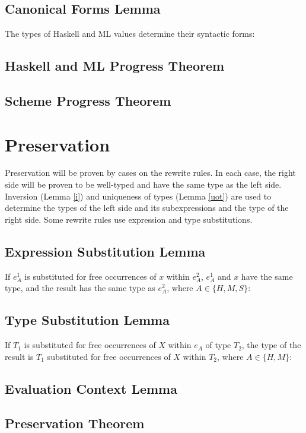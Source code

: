 \subsection{Canonical Forms Lemma}

The types of Haskell and ML values determine their syntactic forms:



\subsection{Haskell and ML Progress Theorem}



\subsection{Scheme Progress Theorem}



\section{Preservation}

Preservation will be proven by cases on the rewrite rules.  In each case, the right side will be proven to be well-typed and have the same type as the left side.  Inversion (Lemma \ref{i}) and uniqueness of types (Lemma \ref{uot}) are used to determine the types of the left side and its subexpressions and the type of the right side.  Some rewrite rules use expression and type substitutions.

\subsection{Expression Substitution Lemma}

If $e_{A}^{1}$ is substituted for free occurrences of $x$ within $e_{A}^{2}$, $e_{A}^{1}$ and $x$ have the same type, and the result has the same type as $e_{A}^{2}$, where $A\in\lbrace H,M,S\rbrace$:



\subsection{Type Substitution Lemma}

If $T_{1}$ is substituted for free occurrences of $X$ within $e_{A}$ of type $T_{2}$, the type of the result is $T_{1}$ substituted for free occurrences of $X$ within $T_{2}$, where $A\in\lbrace H,M\rbrace$:



\subsection{Evaluation Context Lemma}



\subsection{Preservation Theorem}

